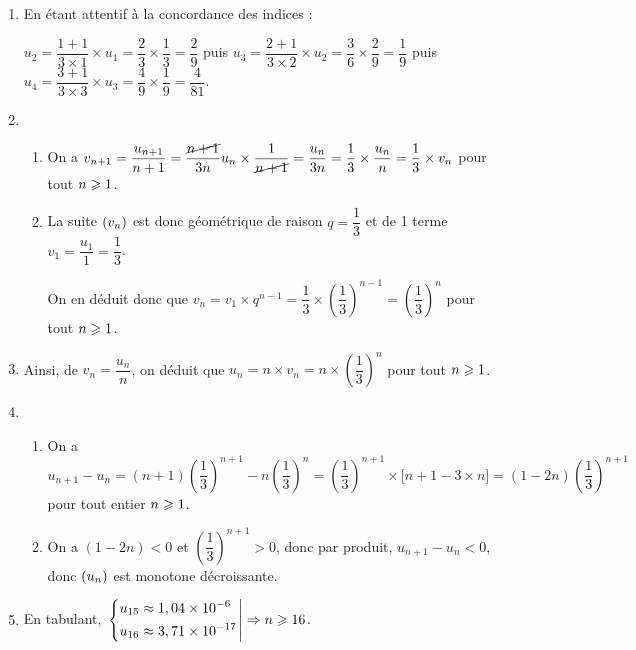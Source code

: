 \documentclass[a4paper,11pt]{article}
\begin{document}
\begin{enumerate}
	\item En étant attentif à la concordance des indices :
	
	$u_2=\dfrac{1+1}{3\times1} \times u_1 = \dfrac23 \times \dfrac13=\dfrac29$ puis $u_3=\dfrac{2+1}{3\times2} \times u_2 = \dfrac36 \times \dfrac29=\dfrac19$ puis $u_4=\dfrac{3+1}{3\times3} \times u_3 = \dfrac49 \times \dfrac19=\dfrac{4}{81}$.
	\item 
	\begin{enumerate}
		\item On a $v_{n+1}=\dfrac{u_{n+1}}{n+1}= \dfrac{\cancel{n+1}}{3n}u_n \times \dfrac{1}{\cancel{n+1}}=\dfrac{u_n}{3n}=\dfrac13 \times \dfrac{u_n}{n} = \dfrac13 \times v_n$ pour tout $n \pg 1$.
		\item La suite $\suiten[v]$ est donc géométrique de raison $q=\dfrac13$ et de 1 terme $v_1=\dfrac{u_1}{1}=\dfrac13$.
		
		On en déduit donc que $v_n = v_1 \times q^{n-1}=\dfrac13 \times \left( \dfrac13 \right)^{n-1} = \left( \dfrac13 \right)^{n}$ pour tout $n \pg 1$.
	\end{enumerate}
	\item Ainsi, de $v_n=\dfrac{u_n}{n}$, on déduit que $u_n = n \times v_n = n \times \left( \dfrac13 \right)^{n}$ pour tout $n \pg 1$.
	\item 
	\begin{enumerate}
		\item On a $u_{n+1}-u_n = (n+1) \left( \dfrac13\right)^{n+1} - n \left( \dfrac13\right)^{n} = \left( \dfrac13\right)^{n+1} \times \big[ n+1 - 3 \times n\big] = (1-2n) \left( \dfrac13\right)^{n+1}$ pour tout entier $n \pg 1$.
		\item On a $(1-2n) <0$ et $\left( \dfrac13\right)^{n+1} >0$, donc par produit, $u_{n+1}-u_n < 0$, donc $\suiten$ est monotone décroissante.
	\end{enumerate}
	\item En tabulant, $\left. \begin{dcases} u_{15} \approx 1,04 \times 10^{-6} \\ u_{16} \approx 3,71 \times 10^{-17} \end{dcases} \right| \Rightarrow n \pg 16$.
\end{enumerate}
\end{document}
